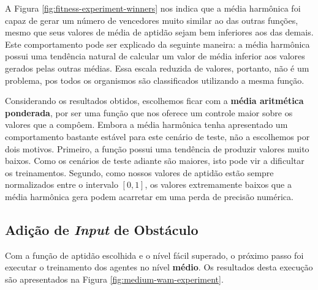 A Figura \ref{fig:fitness-experiment-winners} nos indica que a média harmônica
foi capaz de gerar um número de vencedores muito similar ao das outras funções,
mesmo que seus valores de média de aptidão sejam bem inferiores aos das demais.
Este comportamento pode ser explicado da seguinte maneira: a média harmônica
possui uma tendência natural de calcular um valor de média inferior aos valores
gerados pelas outras médias. Essa escala reduzida de valores, portanto, não é um
problema, pos todos os organismos são classificados utilizando a mesma função.

Considerando os resultados obtidos, escolhemos ficar com a \textbf{média
aritmética ponderada}, por ser uma função que nos oferece um controle maior
sobre os valores que a compôem. Embora a média harmônica tenha apresentado um
comportamento bastante estável para este cenário de teste, não a escolhemos por
dois motivos. Primeiro, a função possui uma tendência de produzir valores muito
baixos.  Como os cenários de teste adiante são maiores, isto pode vir a
dificultar os treinamentos. Segundo, como nossos valores de aptidão estão sempre
normalizados entre o intervalo $[0,1]$, os valores extremamente baixos que a
média harmônica gera podem acarretar em uma perda de precisão numérica.

\subsection{\label{section:obstacle-experiment}Adição de \textit{Input} de
Obstáculo}

Com a função de aptidão escolhida e o nível fácil superado, o próximo passo foi
executar o treinamento dos agentes no nível \textbf{médio}. Os resultados desta
execução são apresentados na Figura \ref{fig:medium-wam-experiment}.

